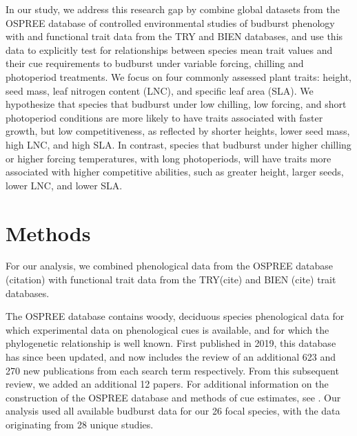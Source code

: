 \documentclass{article}\usepackage[]{graphicx}\usepackage[]{color}
\begin{document}

In our study, we address this research gap by combine global datasets from the OSPREE database of controlled environmental studies of budburst phenology with and functional trait data from the TRY and BIEN databases, and use this data to explicitly test for relationships between species mean trait values and their cue requirements to budburst under variable forcing, chilling and photoperiod treatments. We focus on four commonly assessed plant traits: height, seed mass, leaf nitrogen content (LNC), and specific leaf area (SLA). 
We hypothesize that species that budburst under low chilling, low forcing, and short photoperiod conditions are more likely to have traits associated with faster growth, but low competitiveness, as reflected by shorter heights, lower seed mass, high LNC, and high SLA. In contrast, species that budburst under higher chilling or higher forcing temperatures, with long photoperiods, will have traits more associated with higher competitive abilities, such as greater height, larger seeds, lower LNC, and lower SLA. \\

\section{Methods}
For our analysis, we combined phenological data from the OSPREE database (citation) with functional trait data from the TRY(cite) and BIEN (cite) trait databases. 

The OSPREE database contains woody, deciduous species phenological data for which experimental data on phenological cues is available, and for which the phylogenetic relationship is well known. First published in 2019, this database has since been updated, and now includes the review of an additional 623 and 270 new publications from each search term respectively. From this subsequent review, we added an additional 12 papers. For additional information on the construction of the OSPREE database and methods of cue estimates, see \citep{OSPREE}. Our analysis used all available budburst data for our 26 focal species, with the data originating from 28 unique studies. 
\end{document}
